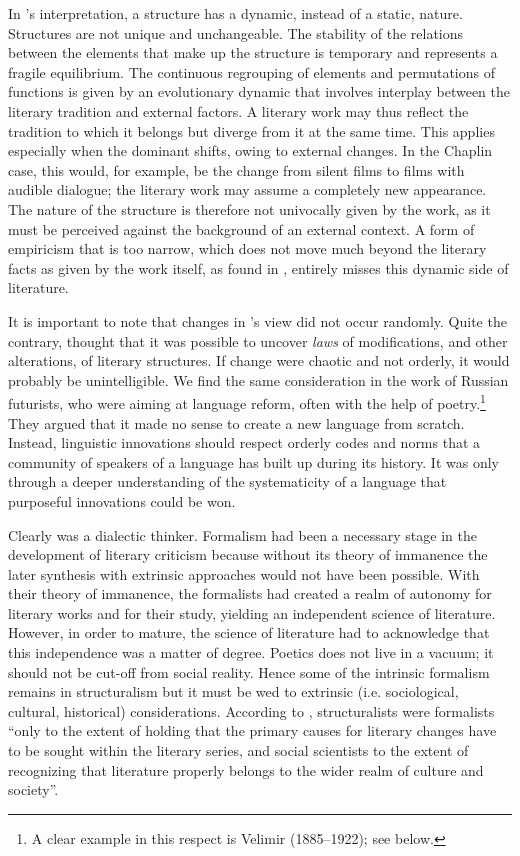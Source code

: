 \documentclass[output=paper]{langscibook}
\begin{document}
In {\Mukarovsky}'s interpretation, a structure has a dynamic, instead of a static, nature. Structures are not unique and unchangeable. The stability of the relations between the elements that make up the structure is temporary and represents a fragile equilibrium. The continuous regrouping of elements and permutations of functions is given by an evolutionary dynamic that involves interplay between the literary tradition and external factors. A literary work may thus reflect the tradition to which it belongs but diverge from it at the same time. This applies especially when the dominant shifts, owing to external changes. In the Chaplin case, this would, for example, be the change from silent films to films with audible dialogue; the literary work may assume a completely new appearance. The nature of the structure is therefore not univocally given by the work, as it must be perceived against the background of an external context. A form of empiricism that is too narrow, which does not move much beyond the literary facts as given by the work itself, as {\Mukarovsky} found in {\Shklovsky}, entirely misses this dynamic side of literature.

\largerpage[1]It is important to note that changes in {\Mukarovsky}'s view did not occur randomly. Quite the contrary, {\Mukarovsky} thought that it was possible to uncover \emph{laws} of modifications, and other alterations, of literary structures. If change were chaotic and not orderly, it would probably be unintelligible. We find the same consideration in the work of Russian futurists, who were aiming at language reform, often with the help of poetry.\footnote{A clear example in this respect is Velimir {\Khlebnikov} (1885--1922); see below.} They argued that it made no sense to create a new language from scratch. Instead, linguistic innovations should respect orderly codes and norms that a community of speakers of a language has built up during its history. It was only through a deeper understanding of the systematicity of a language that purposeful innovations could be won. 

Clearly {\Mukarovsky} was a dialectic thinker. Formalism had been a necessary stage in the development of literary criticism because without its theory of immanence the later synthesis with extrinsic approaches would not have been possible. With their theory of immanence, the formalists had created a realm of autonomy for literary works and for their study, yielding an independent science of literature. However, in order to mature, the science of literature had to acknowledge that this independence was a matter of degree. Poetics does not live in a vacuum; it should not be cut-off from social reality. Hence some of the intrinsic formalism remains in structuralism but it must be wed to extrinsic (i.e. sociological, cultural, historical) considerations. According to \citet[38]{Galan1985}, structuralists were formalists ``only to the extent of holding that the primary causes for literary changes have to be sought within the literary series, and social scientists to the extent of recognizing that literature properly belongs to the wider realm of culture and society''.
\end{document}
